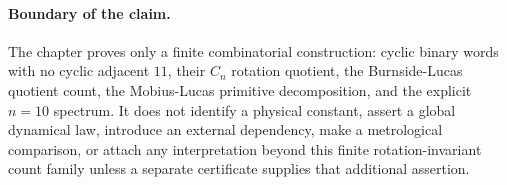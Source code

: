 \paragraph{Boundary of the claim.}
The chapter proves only a finite combinatorial construction: cyclic binary words with no cyclic adjacent $11$, their $C_n$ rotation quotient, the Burnside-Lucas quotient count, the Mobius-Lucas primitive decomposition, and the explicit $n=10$ spectrum. It does not identify a physical constant, assert a global dynamical law, introduce an external dependency, make a metrological comparison, or attach any interpretation beyond this finite rotation-invariant count family unless a separate certificate supplies that additional assertion.
